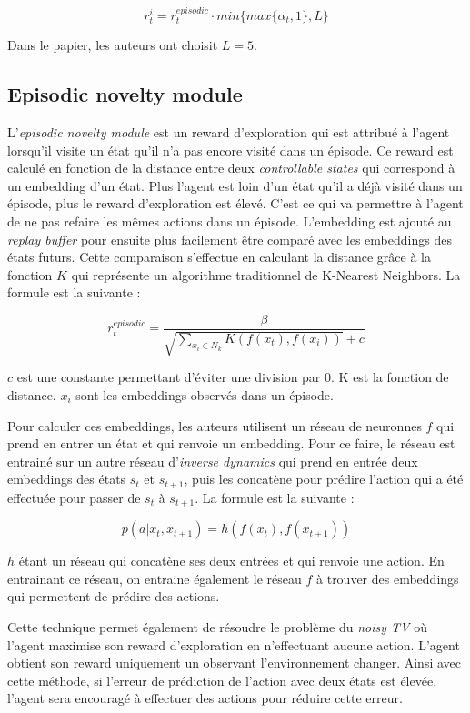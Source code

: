 $$ r^i_t = r^{episodic}_t \cdot min \{ max \{ \alpha_t, 1 \}, L \} $$


Dans le papier, les auteurs ont choisit $L = 5$.

\subsection{Episodic novelty module}

L'\textit{episodic novelty module} est un reward d'exploration qui est attribué à l'agent lorsqu'il visite un état qu'il n'a pas encore visité dans un épisode. Ce reward est calculé en fonction de la distance entre deux \textit{controllable states} qui correspond à un embedding d'un état. Plus l'agent est loin d'un état qu'il a déjà visité dans un épisode, plus le reward d'exploration est élevé. C'est ce qui va permettre à l'agent de ne pas refaire les mêmes actions dans un épisode. L'embedding est ajouté au \textit{replay buffer} pour ensuite plus facilement être comparé avec les embeddings des états futurs.
Cette comparaison s'effectue en calculant la distance grâce à la fonction $K$ qui représente un algorithme traditionnel de K-Nearest Neighbors. La formule est la suivante :

$$ r^{episodic}_t = \frac{\beta}{\sqrt{\sum_{x_i \in N_k} K(f(x_t), f(x_i))} + c} $$

$c$ est une constante permettant d'éviter une division par 0. K est la fonction de distance. $x_i$ sont les embeddings observés dans un épisode.

Pour calculer ces embeddings, les auteurs utilisent un réseau de neuronnes $f$ qui prend en entrer un état et qui renvoie un embedding. Pour ce faire, le réseau est entrainé sur un autre réseau d'\textit{inverse dynamics} qui prend en entrée deux embeddings des états $s_t$ et $s_{t+1}$, puis les concatène pour prédire l'action qui a été effectuée pour passer de $s_t$ à $s_{t+1}$. La formule est la suivante :

$$ p(a | x_t, x_{t+1}) = h(f(x_t), f(x_{t+1})) $$

$h$ étant un réseau qui concatène ses deux entrées et qui renvoie une action. En entrainant ce réseau, on entraine également le réseau $f$ à trouver des embeddings qui permettent de prédire des actions.

Cette technique permet également de résoudre le problème du \textit{noisy TV} où l'agent maximise son reward d'exploration en n'effectuant aucune action. L'agent obtient son reward uniquement un observant l'environnement changer. Ainsi avec cette méthode, si l'erreur de prédiction de l'action avec deux états est élevée, l'agent sera encouragé à effectuer des actions pour réduire cette erreur.

